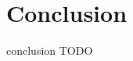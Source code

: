 \documentclass[final]{report}
\begin{document}
\chapter{Conclusion}

conclusion TODO
\end{document}
